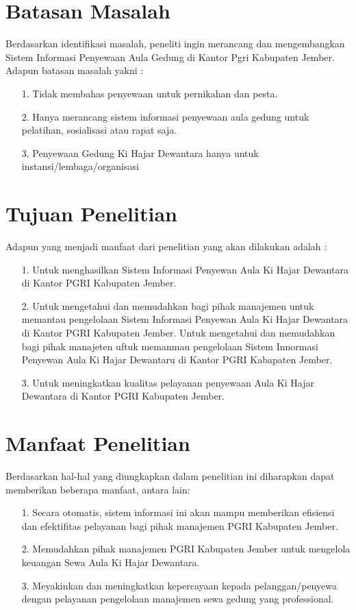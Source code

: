 \documentclass{jtetiproposalskripsi}
\begin{document}
\section{Batasan Masalah}

Berdasarkan identifikasi masalah, peneliti ingin merancang dan mengembangkan Sistem Informasi Penyewaan Aula Gedung di Kantor Pgri Kabupaten Jember. Adapun batasan masalah yakni : 
\begin{itemize}
\item[1.] Tidak membahas penyewaan untuk pernikahan dan pesta.
\item[2.] Hanya merancang sistem informasi penyewaan aula gedung untuk pelatihan, sosialisasi atau rapat saja.
\item[3.] Penyewaan Gedung Ki Hajar Dewantara hanya untuk instansi/lembaga/organisasi
\end{itemize}

\section{Tujuan Penelitian}
Adapun yang menjadi manfaat dari penelitian yang akan dilakukan adalah :
\begin{itemize}
\item[1.] Untuk menghasilkan Sistem Informasi Penyewan Aula Ki Hajar Dewantara di Kantor PGRI Kabupaten Jember.
\item[2.] Untuk mengetahui dan memudahkan bagi pihak manajemen untuk memantau pengelolaan Sistem Informasi Penyewan Aula Ki Hajar Dewantara di Kantor PGRI Kabupaten Jember. Untuk mengetahui dan memudahkan bagi pihak manajeten uftuk memanmau pengelolaan
Sistem Innormasi Penyewan Aula Ki Hajar Dewantaru di Kantor PGRI Kabapaten
Jember.
\item[3.] Untuk meningkatkan kualitas pelayanan penyewaan Aula Ki Hajar Dewantara di Kantor PGRI Kabupaten Jember.
\end{itemize}

\section{Manfaat Penelitian}
Berdasarkan hal-hal yang diungkapkan dalam penelitian ini diharapkan dapat memberikan beberapa manfaat, antara lain:
\begin{itemize}
\item[1.] Secara otomatis, sistem informasi ini akan mampu memberikan efisiensi dan efektifitas pelayanan bagi pihak manajemen PGRI Kabupaten Jember.
\item[2.] Memudahkan pihak manajemen PGRI Kabupaten Jember untuk mengelola keuangan Sewa Aula Ki Hajar Dewantara.
\item[3.] Meyakinkan dan meningkatkan kepercayaan kepada pelanggan/penyewa dengan pelayanan pengelolaan manajemen sewa gedung yang professional.
\end{itemize}
\end{document}
